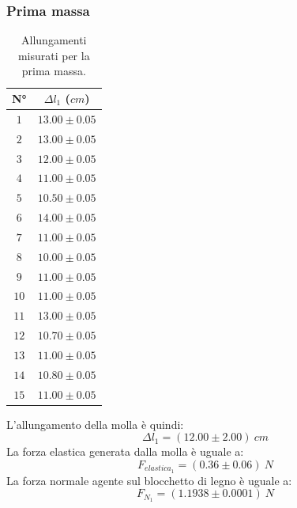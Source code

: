 \documentclass[11pt]{article}
\begin{document}
\subsubsection{Prima massa}
\begin{table}[H]
\centering
\begin{tabular}{|c|c|}
\hline
\textbf{N°} & \textbf{$\Delta l_1$ ($cm$)}\\
\hline
$1$ & $13.00\pm 0.05$ \\
\hline
$2$ & $13.00\pm 0.05$ \\
\hline
$3$ & $12.00\pm 0.05$ \\
\hline
$4$ & $11.00\pm 0.05$ \\
\hline
$5$ & $10.50\pm 0.05$ \\
\hline
$6$ & $14.00\pm 0.05$ \\
\hline
$7$ & $11.00\pm 0.05$ \\
\hline
$8$ & $10.00\pm 0.05$ \\
\hline
$9$ & $11.00\pm 0.05$ \\
\hline
$10$ & $11.00\pm 0.05$ \\
\hline
$11$ & $13.00\pm 0.05$ \\
\hline
$12$ & $10.70\pm 0.05$ \\
\hline
$13$ & $11.00\pm 0.05$ \\
\hline
$14$ & $10.80\pm 0.05$ \\
\hline
$15$ & $11.00\pm 0.05$ \\
\hline
\end{tabular}
\caption{Allungamenti misurati per la prima massa.}
\label{tab:}
\end{table}
L'allungamento della molla è quindi:
\begin{equation}
    \Delta l_1=(12.00\pm 2.00)\ cm
\end{equation}
La forza elastica generata dalla molla è uguale a:
\begin{equation}
    F_{elastica_1} = (0.36\pm 0.06)\ N
\end{equation}
La forza normale agente sul blocchetto di legno è uguale a:
\begin{equation}
    F_{N_1} = (1.1938\pm 0.0001)\ N
\end{equation}
\end{document}

